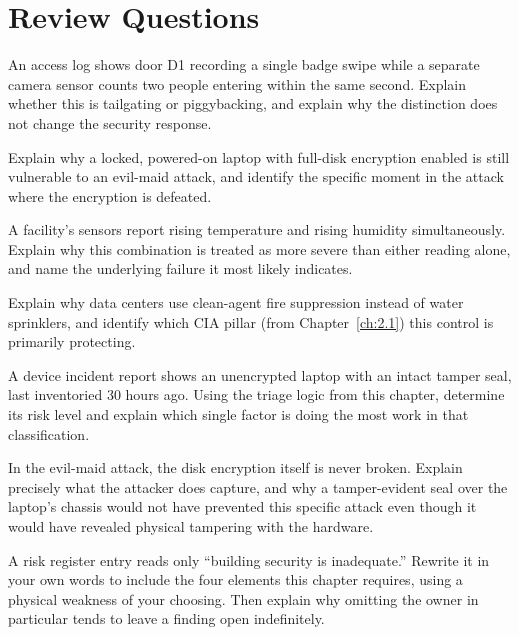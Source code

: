\section*{Review Questions}
\begin{reviewquestions}
\item An access log shows door D1 recording a single badge swipe while a separate camera sensor
counts two people entering within the same second. Explain whether this is tailgating or
piggybacking, and explain why the distinction does not change the security response.
\item Explain why a locked, powered-on laptop with full-disk encryption enabled is still
vulnerable to an evil-maid attack, and identify the specific moment in the attack where the
encryption is defeated.
\item A facility's sensors report rising temperature and rising humidity simultaneously. Explain
why this combination is treated as more severe than either reading alone, and name the underlying
failure it most likely indicates.
\item Explain why data centers use clean-agent fire suppression instead of water sprinklers, and
identify which CIA pillar (from Chapter~\ref{ch:2.1}) this control is primarily protecting.
\item A device incident report shows an unencrypted laptop with an intact tamper seal, last
inventoried 30 hours ago. Using the triage logic from this chapter, determine its risk level and
explain which single factor is doing the most work in that classification.
\item In the evil-maid attack, the disk encryption itself is never broken. Explain precisely what
the attacker does capture, and why a tamper-evident seal over the laptop's chassis would not have
prevented this specific attack even though it would have revealed physical tampering with the
hardware.
\item A risk register entry reads only ``building security is inadequate.'' Rewrite it in your
own words to include the four elements this chapter requires, using a physical weakness of your
choosing. Then explain why omitting the owner in particular tends to leave a finding open
indefinitely.
\end{reviewquestions}

